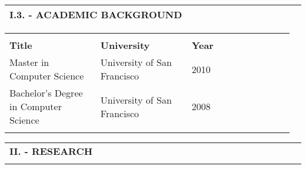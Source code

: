 \documentclass[11pt, letterpaper]{extarticle}
\begin{document}

	\label{sec:I.3.}
	\begin{longtable}{C{1.012\linewidth}N}
		\textbf{\large I.3. - ACADEMIC BACKGROUND} & \\[0.70cm] \hline
	\end{longtable}

	\begin{longtable}{C{0.320\linewidth}C{0.320\linewidth}C{0.320\linewidth}N}
		                                                                                                     &                                                                                                      &                                                                                                      & \\[-0.25cm]
		\textbf{Title}                                                                                       & \textbf{University}                                                                                  & \textbf{Year}                                                                                        & \\[0.40cm]
		Master in Computer Science                                                                           & University of San Francisco                                                                          & 2010                                                                                                 & \\[0.40cm]
		Bachelor's Degree in Computer Science                                                                & University of San Francisco                                                                          & 2008                                                                                                 & \\[0.40cm]
		                                                                                                     &                                                                                                      &                                                                                                      & \\[-0.25cm] \hline
	\end{longtable}

	\newpage


	\label{tab:II}
	\begin{longtable}{C{1.000\linewidth}C{0.000\linewidth}N} 
		\textbf{\Large II. - RESEARCH} & \\[0.80cm] 
	\end{longtable}
\end{document}
